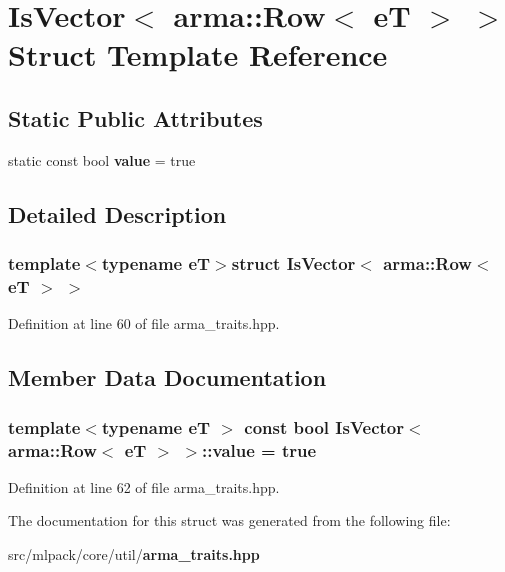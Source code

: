 \section{Is\-Vector$<$ arma\-:\-:Row$<$ e\-T $>$ $>$ Struct Template Reference}
\label{structIsVector_3_01arma_1_1Row_3_01eT_01_4_01_4}
\subsection*{Static Public Attributes}
\begin{DoxyCompactItemize}
\item 
static const bool {\bf value} = true
\end{DoxyCompactItemize}


\subsection{Detailed Description}
\subsubsection*{template$<$typename e\-T$>$struct Is\-Vector$<$ arma\-::\-Row$<$ e\-T $>$ $>$}



Definition at line 60 of file arma\-\_\-traits.\-hpp.



\subsection{Member Data Documentation}
\subsubsection[{value}]{\setlength{\rightskip}{0pt plus 5cm}template$<$typename e\-T $>$ const bool {\bf Is\-Vector}$<$ arma\-::\-Row$<$ e\-T $>$ $>$\-::value = true\hspace{0.3cm}{\ttfamily [static]}}\label{structIsVector_3_01arma_1_1Row_3_01eT_01_4_01_4_a0f839e96733edeb3d9591ac270a37f1c}


Definition at line 62 of file arma\-\_\-traits.\-hpp.



The documentation for this struct was generated from the following file\-:\begin{DoxyCompactItemize}
\item 
src/mlpack/core/util/{\bf arma\-\_\-traits.\-hpp}\end{DoxyCompactItemize}
